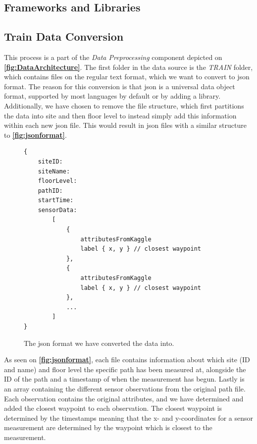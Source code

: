 \subsection{Frameworks and Libraries}

\subsection{Train Data Conversion}
This process is a part of the \textit{Data Preprocessing} component depicted on \textbf{\autoref{fig:DataArchitecture}}. The first folder in the data source is the \textit{TRAIN} folder, which contains files on the regular text format, which we want to convert to \gls{json} format. The reason for this conversion is that \gls{json} is a universal data object format, supported by most languages by default or by adding a library. Additionally, we have chosen to remove the file structure, which first partitions the data into site and then floor level to instead simply add this information within each new \gls{json} file. This would result in \gls{json} files with a similar structure to \textbf{\autoref{fig:jsonformat}}.

\begin{figure}[H]
\lstset{numbers=left}
\begin{lstlisting}
{ 
    siteID:
    siteName:
    floorLevel:
    pathID:
    startTime:
    sensorData: 
        [
            {
                attributesFromKaggle
                label { x, y } // closest waypoint
            },
            {
                attributesFromKaggle
                label { x, y } // closest waypoint
            },
            ...
        ]
}
\end{lstlisting}
\caption{The \gls{json} format we have converted the data into.}
\label{fig:jsonformat}
\end{figure}

As seen on \textbf{\autoref{fig:jsonformat}}, each file contains information about which site (ID and name) and floor level the specific path has been measured at, alongside the ID of the path and a timestamp of when the measurement has begun. Lastly is an array containing the different sensor observations from the original path file. Each observation contains the original attributes, and we have determined and added the closest waypoint to each observation. The closest waypoint is determined by the timestamps meaning that the x- and y-coordinates for a sensor measurement are determined by the waypoint which is closest to the measurement. 

